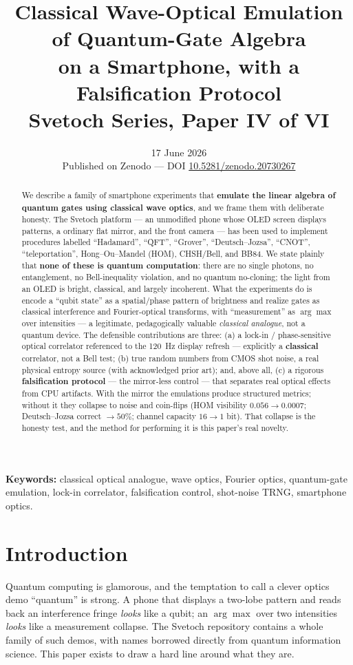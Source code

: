 \documentclass[11pt]{article}
\title{\textbf{Classical Wave-Optical Emulation of Quantum-Gate Algebra\\
on a Smartphone, with a Falsification Protocol}\\[4pt]
{\large Svetoch Series, Paper IV of VI}}
\author{\svetochauthor}
\date{17 June 2026\\[2pt]{\normalsize Published on Zenodo --- DOI \href{https://doi.org/10.5281/zenodo.20730267}{10.5281/zenodo.20730267}}}
\begin{document}
\maketitle

\begin{abstract}
\noindent We describe a family of smartphone experiments that \textbf{emulate the linear
algebra of quantum gates using classical wave optics}, and we frame them with deliberate
honesty. The Svetoch platform --- an unmodified phone whose OLED screen displays patterns, a
ordinary flat mirror, and the front camera --- has been used to implement procedures labelled
``Hadamard'', ``QFT'', ``Grover'', ``Deutsch--Jozsa'', ``CNOT'', ``teleportation'',
Hong--Ou--Mandel (HOM), CHSH/Bell, and BB84. We state plainly that \textbf{none of these is
quantum computation}: there are no single photons, no entanglement, no Bell-inequality
violation, and no quantum no-cloning; the light from an OLED is bright, classical, and largely
incoherent. What the experiments do is encode a ``qubit state'' as a spatial/phase pattern of
brightness and realize gates as classical interference and Fourier-optical transforms, with
``measurement'' as $\arg\max$ over intensities --- a legitimate, pedagogically valuable
\emph{classical analogue}, not a quantum device. The defensible contributions are three: (a) a
lock-in / phase-sensitive optical correlator referenced to the \SI{120}{\hertz} display refresh
--- explicitly a \textbf{classical} correlator, not a Bell test; (b) true random numbers from
CMOS shot noise, a real physical entropy source (with acknowledged prior art); and, above all,
(c) a rigorous \textbf{falsification protocol} --- the mirror-less control --- that separates
real optical effects from CPU artifacts. With the mirror the emulations produce structured
metrics; without it they collapse to noise and coin-flips (HOM visibility $0.056 \to 0.0007$;
Deutsch--Jozsa correct $\to 50\%$; channel capacity $16 \to 1$ bit). That collapse is the
honesty test, and the method for performing it is this paper's real novelty.
\end{abstract}

\noindent\textbf{Keywords:} classical optical analogue, wave optics, Fourier optics,
quantum-gate emulation, lock-in correlator, falsification control, shot-noise TRNG, smartphone
optics.

\section{Introduction}
Quantum computing is glamorous, and the temptation to call a clever optics demo ``quantum'' is
strong. A phone that displays a two-lobe pattern and reads back an interference fringe
\emph{looks} like a qubit; an $\arg\max$ over two intensities \emph{looks} like a measurement
collapse. The Svetoch repository contains a whole family of such demos, with names borrowed
directly from quantum information science. This paper exists to draw a hard line around what
they are.
\end{document}
